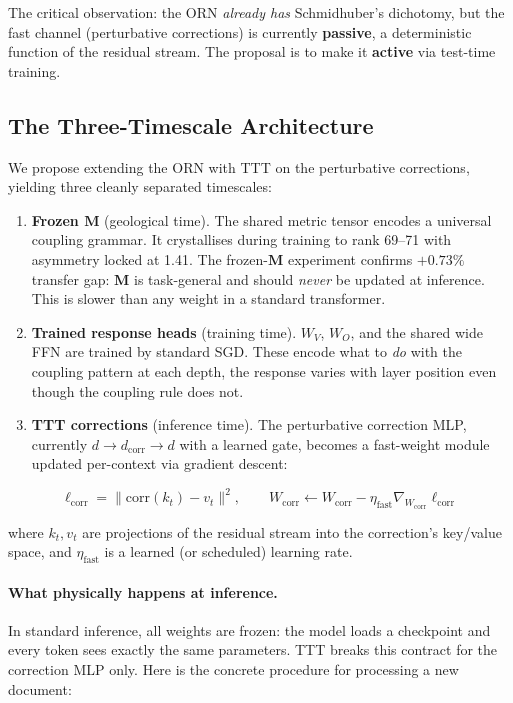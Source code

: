 \documentclass[11pt, a4paper]{article}
\newcommand{\M}{\mathbf{M}}
\theoremstyle{plain}
\theoremstyle{definition}
\theoremstyle{remark}
\begin{document}
The critical observation: the ORN \emph{already has} Schmidhuber's dichotomy, but the fast channel (perturbative corrections) is currently \textbf{passive}, a deterministic function of the residual stream.
The proposal is to make it \textbf{active} via test-time training.

\subsection{The Three-Timescale Architecture}

We propose extending the ORN with TTT on the perturbative corrections, yielding three cleanly separated timescales:

\begin{enumerate}[nosep]
\item \textbf{Frozen $\M$} (geological time). The shared metric tensor encodes a universal coupling grammar.
      It crystallises during training to rank 69--71 with asymmetry locked at 1.41.
      The frozen-$\M$ experiment confirms $+0.73\%$ transfer gap: $\M$ is task-general and should \emph{never} be updated at inference.
      This is slower than any weight in a standard transformer.

\item \textbf{Trained response heads} (training time). $W_V$, $W_O$, and the shared wide FFN are trained by standard SGD.
      These encode what to \emph{do} with the coupling pattern at each depth, the response varies with layer position even though the coupling rule does not.

\item \textbf{TTT corrections} (inference time). The perturbative correction MLP, currently $d \to d_{\mathrm{corr}} \to d$ with a learned gate, becomes a fast-weight module updated per-context via gradient descent:
\end{enumerate}

\begin{equation}
\label{eq:ttt-correction}
\ell_{\mathrm{corr}} = \| \mathrm{corr}(k_t) - v_t \|^2, \qquad
W_{\mathrm{corr}} \leftarrow W_{\mathrm{corr}} - \eta_{\mathrm{fast}} \nabla_{W_{\mathrm{corr}}} \ell_{\mathrm{corr}}
\end{equation}

where $k_t, v_t$ are projections of the residual stream into the correction's key/value space, and $\eta_{\mathrm{fast}}$ is a learned (or scheduled) learning rate.

\paragraph{What physically happens at inference.}
In standard inference, all weights are frozen: the model loads a checkpoint and every token sees exactly the same parameters.
TTT breaks this contract for the correction MLP only.
Here is the concrete procedure for processing a new document:
\end{document}
